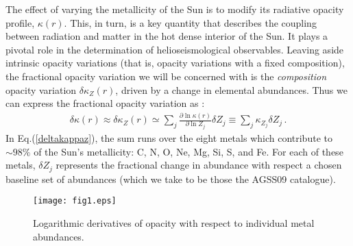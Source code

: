 \documentclass[aps,prl,twocolumn,showpacs]{revtex4}
\begin{document}
%
The effect of varying the metallicity of the Sun is to modify its radiative opacity profile, $\kappa (r)$. This, in turn, is a key quantity that describes the coupling between radiation and matter in the hot dense interior of the Sun. It plays a pivotal role in the determination of helioseismological observables. Leaving aside intrinsic opacity variations (that is, opacity variations with a fixed composition), the fractional opacity variation we will be concerned with is the \textit{composition} opacity variation $\delta \kappa _Z(r)$, driven by a change in elemental abundances. Thus we can express the fractional opacity variation as \cite{villante3}:
%
\begin{eqnarray}
\delta \kappa (r) \approx \delta \kappa _Z (r) \simeq \sum _j \frac{\partial \ln \kappa (r)}{\partial \ln Z_j}\delta Z_j \equiv \sum _j \kappa _{Z_j}\delta Z_j \, .
\label{deltakappaz}
\end{eqnarray}
%
In Eq.(\ref{deltakappaz}), the sum runs over the eight metals which contribute to $\sim 98\%$ of the Sun's metallicity: C, N, O, Ne, Mg, Si, S, and Fe. For each of these metals, $\delta Z_j$ represents the fractional change in abundance with respect a chosen baseline set of abundances (which we take to be those the AGSS09 catalogue). \newline \indent
%
\begin{figure}[t]
\texttt{[image: fig1.eps]}
\caption{Logarithmic derivatives of opacity with respect to individual metal abundances.}
\label{fig1}
\end{figure}
\end{document}
